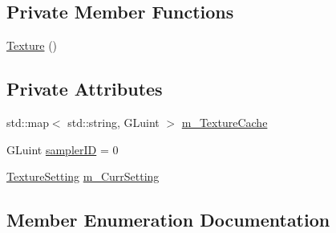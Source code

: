 \subsection*{Private Member Functions}
\begin{DoxyCompactItemize}
\item 
\hyperlink{class_face3_d_1_1_texture_af22c3684f7cef6023862f61cab25bb98}{Texture} ()
\end{DoxyCompactItemize}
\subsection*{Private Attributes}
\begin{DoxyCompactItemize}
\item 
std\+::map$<$ std\+::string, G\+Luint $>$ \hyperlink{class_face3_d_1_1_texture_a12f88846d60462abc4898b0a9cc54bf9}{m\+\_\+\+Texture\+Cache}
\item 
G\+Luint \hyperlink{class_face3_d_1_1_texture_a4d9b0c399e52a64c72f096ffb768e6e7}{sampler\+ID} = 0
\item 
\hyperlink{class_face3_d_1_1_texture_aa2d0d0213ac74b112ce13cf5511a0573}{Texture\+Setting} \hyperlink{class_face3_d_1_1_texture_ab3ef103303845ee062b3c2d0618d6c32}{m\+\_\+\+Curr\+Setting}
\end{DoxyCompactItemize}


\subsection{Member Enumeration Documentation}
